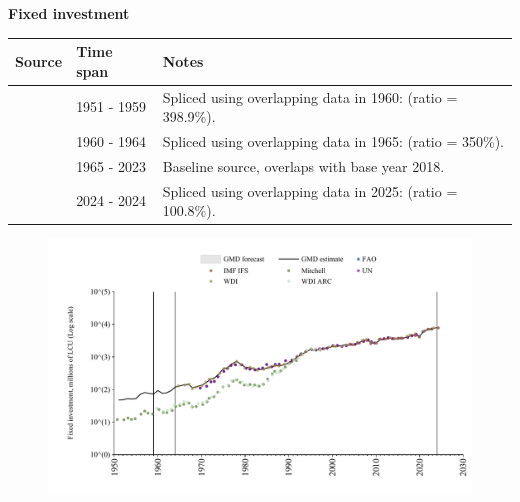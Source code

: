 \documentclass[12pt,a4paper,landscape]{article}
\begin{document}
\begin{adjustbox}{max totalsize={\paperwidth}{\paperheight},center}
\begin{minipage}[t][\textheight][t]{\textwidth}
\vspace*{0.5cm}
{}
\begin{center}
{\Large\bfseries Fixed investment}
\end{center}
\vspace{0.5cm}
\begin{table}[H]
\centering
\small
\begin{tabular}{|l|l|l|}
\hline
\textbf{Source} & \textbf{Time span} & \textbf{Notes} \\
\hline
\rowcolor{white}\cite{Mitchell}& 1951 - 1959 &Spliced using overlapping data in 1960: (ratio = 398.9\%). \\
\rowcolor{lightgray}\cite{WDI_ARC}& 1960 - 1964 &Spliced using overlapping data in 1965: (ratio = 350\%). \\
\rowcolor{white}\cite{WDI}& 1965 - 2023 &Baseline source, overlaps with base year 2018. \\
\rowcolor{lightgray}\cite{IMF_IFS}& 2024 - 2024 &Spliced using overlapping data in 2025: (ratio = 100.8\%). \\
\hline
\end{tabular}
\end{table}
\begin{figure}[H]
\centering
\includegraphics[width=\textwidth,height=0.6\textheight,keepaspectratio]{graphs/SLV_finv.pdf}
\end{figure}
\end{minipage}
\end{adjustbox}
\end{document}
